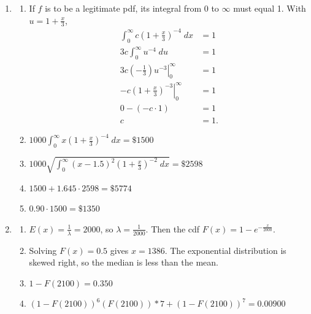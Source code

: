 \documentclass[12pt,letterpaper]{article}
\begin{document}
\begin{enumerate}
	\item 
		\begin{enumerate}
			\item If $f$ is to be a legitimate pdf, its integral from 0 to
				$\infty$ must equal 1. With $u = 1+\frac{x}{3}$,
				\begin{align*}
					\int_0^\infty c\left(1+\frac{x}{3}\right)^{-4} \;dx &= 1 \\
					3c\int_0^\infty u^{-4} \;du &= 1 \\
					3c\left.\left(-\frac{1}{3}\right)u^{-3} \right|_0^\infty &= 1 \\
					-c\left.\left(1+\frac{x}{3}\right)^{-3} \right|_0^\infty &= 1 \\
					0 - (-c\cdot1) &= 1 \\
					c &= \boxed{1}.
				\end{align*}
			\item $1000\int_0^\infty x\left(1+\frac{x}{3}\right)^{-4} \;dx = \boxed{\$1500}$
			\item $1000\sqrt{\int_0^\infty (x-1.5)^2 \left(1+\frac{x}{3}\right)^{-2} \;dx} = \boxed{\$2598}$
			\item $1500 + 1.645\cdot2598 = \boxed{\$5774}$
			\item $0.90 \cdot 1500 = \boxed{\$1350}$
		\end{enumerate}

	\item 
		\begin{enumerate}
			\item $E(x) = \frac{1}{\lambda} = 2000$, so $\lambda = \frac{1}{2000}$. Then the cdf $F(x) = \boxed{1-e^{-\frac{x}{2000}}}$.
			\item Solving $F(x) = 0.5$ gives $x = 1386$. The exponential distribution is skewed right, so the median is less than the mean.
			\item $1-F(2100) = \boxed{0.350}$
			\item $(1-F(2100))^6(F(2100)) * 7 + (1-F(2100))^7 = \boxed{0.00900}$
		\end{enumerate}


\end{enumerate}
\end{document}
